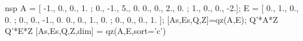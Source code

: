 \begin{examples}
  \begin{mintednsp}{nsp}
 A = [ -1.,  0., 0.,  1. ; 0., -1., 5.,  0. 
        0.,  0., 2.,  0. ; 1.,  0., 0., -2.];
 E = [  0.,  1.,  0., 0. ; 0.,  0., -1., 0. 
        0.,  0.,  1., 0. ; 0.,  0.,  0., 1. ];
 [As,Es,Q,Z]=qz(A,E);
 Q'*A*Z 
 Q'*E*Z 
 [As,Es,Q,Z,dim] = qz(A,E,sort='c')
  \end{mintednsp}
\end{examples}
\begin{manseealso}
    
\end{manseealso}
